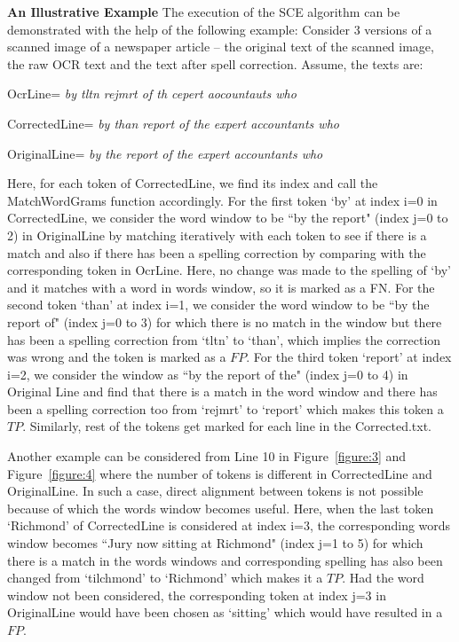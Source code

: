\documentclass[preprint,11pt]{elsarticle}
\begin{document}
\textbf{An Illustrative Example } The execution of the SCE algorithm can be demonstrated with the help of the following example:
Consider 3 versions of a scanned image of a newspaper article -- the original text of the scanned image, the raw OCR text and the text after spell correction. %
Assume, the texts are:

OcrLine= \textit{by tltn rejmrt of th cepert aocountauts who}

CorrectedLine= \textit{by than report of the expert accountants who}

OriginalLine= \textit{by the report of the expert accountants who} 

\noindent Here, for each token of CorrectedLine, we find its index and call the MatchWordGrams function accordingly. For the first token `by' at index i=0 in CorrectedLine, we consider the word window to be ``by the report" (index j=0 to 2) in OriginalLine by matching iteratively with each token to see if there is a match and also if there has been a spelling correction by comparing with the corresponding token in OcrLine. Here, no change was made to the spelling of `by' and it matches with a word in words window, so it is marked as a FN. For the second token `than' at index i=1, we consider the word window to be ``by the report of" (index j=0 to 3) for which there is no match in the window but there has been a spelling correction from `tltn' to `than', which implies the correction was wrong and the token is marked as a $FP$. For the third token `report' at index i=2, we consider the window as ``by the report of the" (index j=0 to 4) in Original Line and find that there is a match in the word window and there has been a spelling correction too from `rejmrt' to `report' which makes this token a $TP$. Similarly, rest of the tokens get marked for each line in the Corrected.txt. 

Another example can be considered from Line 10 in Figure~\ref{figure:3} and Figure~\ref{figure:4} where the number of tokens is different in CorrectedLine and OriginalLine. In such a case, direct alignment between tokens is not possible because of which the words window becomes useful. Here, when the last token `Richmond' of CorrectedLine is considered at index i=3, the corresponding words window becomes ``Jury now sitting at Richmond" (index j=1 to 5) for which there is a match in the words windows and corresponding spelling has also been changed from `tilchmond' to `Richmond' which makes it a $TP$. Had the word window not been considered, the corresponding token at index j=3 in OriginalLine would have been chosen as `sitting' which would have resulted in a $FP$. 
   
\end{document}

